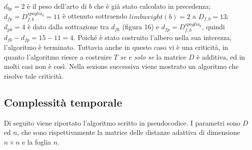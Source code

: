 \newline
$d_{bp}=2$ è il peso dell'arto di $b$ che è già stato calcolato in precedenza; $d_{fp}=D^{spoglia_{b}}_{f,b}=11$ è ottenuto sottraendo $limbweight(b)=2$ a $D_{f,b}=13$; $d_{pk}=4$ è dato dalla sottrazione tra $d_{fk}$ (figura 16) e $d_{fp}=D^{spoglia_{b}}_{f,b}$, quindi $d_{fk}-d_{fp}=15-11=4$.
\newline
Poiché è stato costruito l'albero nella sua interezza, l'algoritmo è terminato. Tuttavia anche in questo caso vi è una criticità, in quanto l'algoritmo riesce a costruire $T$ \textit{se e solo se} la matrice $D$ è additiva, ed in molti casi non è così.
\newline
Nella sezione successiva viene mostrato un algoritmo che risolve tale criticità.

\newpage
\subsection{Complessità temporale}
Di seguito viene riportato l'algoritmo scritto in pseudocodice. I parametri sono $D$ ed $n$, che sono rispettivamente la matrice delle distanze adattiva di dimensione $n \times n$ e la foglia $n$.

